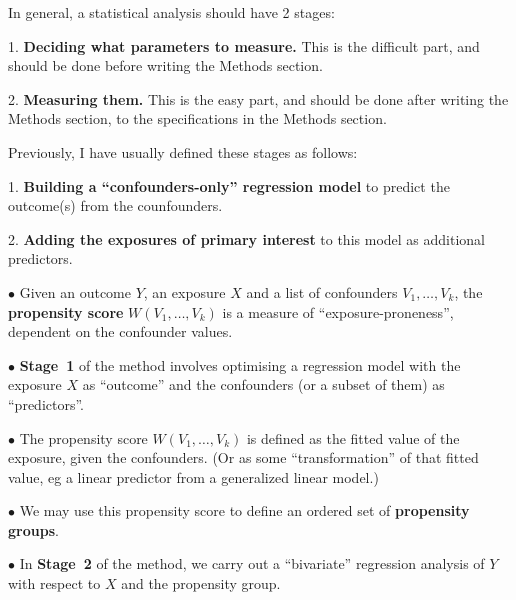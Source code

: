 
In general, a statistical analysis should have 2 stages:

\beginitems

\item{1.} {\bf Deciding what parameters to measure.} This is the difficult part, and should be done before writing the Methods section.

\item{2.} {\bf Measuring them.} This is the easy part, and should be done after writing the Methods section,
to the specifications in the Methods section.

\enditems

Previously, I have usually defined these stages as follows:

\beginitems

\item{1.} {\bf Building a ``confounders-only'' regression model} to predict
the outcome(s) from the counfounders.

\item{2.} {\bf Adding the exposures of primary interest} to this model as additional predictors.

\enditems

\vfill\eject
{}

\beginitems

\item{$\bullet$} Given an outcome $Y$, an exposure $X$ and a list of confounders $V_1,\ldots,V_k$,
the {\bf propensity score} $W(V_1,\ldots,V_k)$ is a measure of ``exposure-proneness'', dependent on the confounder values.

\item{$\bullet$} {\bf Stage~1} of the method involves optimising a regression model with the exposure $X$ as ``outcome'' and the confounders (or a subset of them)
as ``predictors''.

\item{$\bullet$} The propensity score $W(V_1,\ldots,V_k)$ is defined as the fitted value of the exposure, given the confounders. (Or as some
``transformation'' of that fitted value, eg a linear predictor from a generalized linear model.)

\item{$\bullet$} We may use this propensity score to define an ordered set of {\bf propensity groups}.

\item{$\bullet$} In {\bf Stage~2} of the method, we carry out a ``bivariate'' regression analysis of $Y$ with respect to $X$ and the propensity group.

